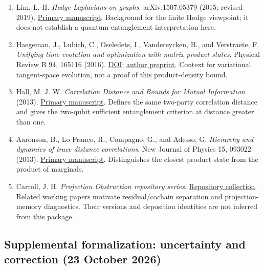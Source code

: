 \documentclass[
  11pt,
]{article}
\providecommand{\tightlist}{%
  \setlength{\itemsep}{0pt}\setlength{\parskip}{0pt}}
\providecommand{\tightlist}{%
  \setlength{\itemsep}{0pt}\setlength{\parskip}{0pt}}
\begin{document}
\begin{enumerate}
\def\labelenumi{\arabic{enumi}.}
\tightlist
\item
  Lim, L.-H. \emph{Hodge Laplacians on graphs}. arXiv:1507.05379 (2015; revised 2019).
  \href{https://arxiv.org/abs/1507.05379}{Primary manuscript}.
  Background for the finite Hodge viewpoint; it does not establish a
  quantum-entanglement interpretation here.
\item
  Haegeman, J., Lubich, C., Oseledets, I., Vandereycken, B., and Verstraete, F.
  \emph{Unifying time evolution and optimization with matrix product states}.
  Physical Review B 94, 165116 (2016).
  \href{https://doi.org/10.1103/PhysRevB.94.165116}{DOI};
  \href{https://arxiv.org/abs/1408.5056}{author preprint}.
  Context for variational tangent-space evolution, not a proof of this
  product-density bound.
\item
  Hall, M. J. W. \emph{Correlation Distance and Bounds for Mutual Information} (2013).
  \href{https://arxiv.org/html/1307.2697v1}{Primary manuscript}.
  Defines the same two-party correlation distance and gives the two-qubit
  sufficient entanglement criterion at distance greater than one.
\item
  Aaronson, B., Lo Franco, R., Compagno, G., and Adesso, G.
  \emph{Hierarchy and dynamics of trace distance correlations}.
  New Journal of Physics 15, 093022 (2013).
  \href{https://arxiv.org/abs/1307.3953}{Primary manuscript}.
  Distinguishes the closest product state from the product of marginals.
\item
  Carroll, J. H. \emph{Projection Obstruction repository series}.
  \href{https://github.com/dbccpage/theory_of_finite_quantum_mechanics/tree/main/atlas/projection_obstruction}{Repository collection}.
  Related working papers motivate residual/cochain separation and
  projection-memory diagnostics. Their versions and deposition identities
  are not inferred from this package.
\end{enumerate}

\subsection{Supplemental formalization: uncertainty and correction (23 October 2026)}\label{supplemental-formalization-uncertainty-and-correction-23-october-2026}
\end{document}
